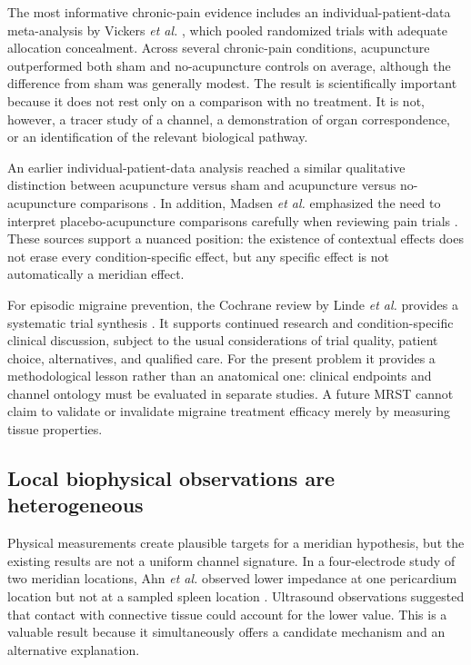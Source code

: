 \documentclass[conference]{IEEEtran}
\begin{document}
The most informative chronic-pain evidence includes an individual-patient-data meta-analysis by Vickers \emph{et al.} \cite{vickers2018}, which pooled randomized trials with adequate allocation concealment. Across several chronic-pain conditions, acupuncture outperformed both sham and no-acupuncture controls on average, although the difference from sham was generally modest. The result is scientifically important because it does not rest only on a comparison with no treatment. It is not, however, a tracer study of a channel, a demonstration of organ correspondence, or an identification of the relevant biological pathway.

An earlier individual-patient-data analysis reached a similar qualitative distinction between acupuncture versus sham and acupuncture versus no-acupuncture comparisons \cite{vickers2012}. In addition, Madsen \emph{et al.} emphasized the need to interpret placebo-acupuncture comparisons carefully when reviewing pain trials \cite{madsen2009}. These sources support a nuanced position: the existence of contextual effects does not erase every condition-specific effect, but any specific effect is not automatically a meridian effect.

For episodic migraine prevention, the Cochrane review by Linde \emph{et al.} provides a systematic trial synthesis \cite{linde2016}. It supports continued research and condition-specific clinical discussion, subject to the usual considerations of trial quality, patient choice, alternatives, and qualified care. For the present problem it provides a methodological lesson rather than an anatomical one: clinical endpoints and channel ontology must be evaluated in separate studies. A future MRST cannot claim to validate or invalidate migraine treatment efficacy merely by measuring tissue properties.

\subsection{Local biophysical observations are heterogeneous}

Physical measurements create plausible targets for a meridian hypothesis, but the existing results are not a uniform channel signature. In a four-electrode study of two meridian locations, Ahn \emph{et al.} observed lower impedance at one pericardium location but not at a sampled spleen location \cite{ahn2005}. Ultrasound observations suggested that contact with connective tissue could account for the lower value. This is a valuable result because it simultaneously offers a candidate mechanism and an alternative explanation.
\end{document}
